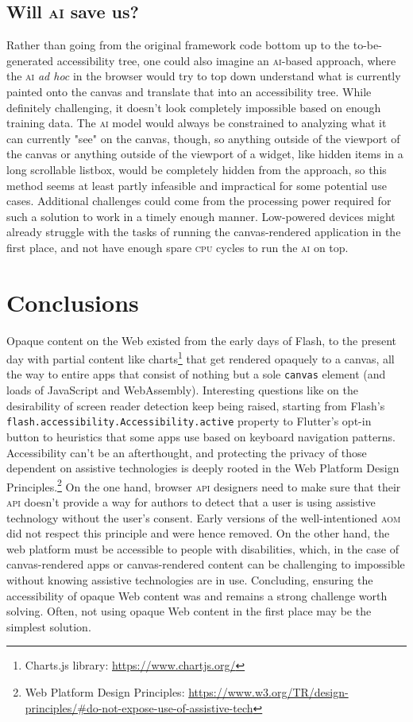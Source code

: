 \documentclass[sigconf]{acmart}
\begin{document}
\subsection{Will \textsc{ai} save us?}

Rather than going from the original framework code bottom up to the to-be-generated accessibility tree, one could also imagine an \textsc{ai}-based approach, where the \textsc{ai} \textit{ad hoc} in the browser would try to top down understand what is currently painted onto the canvas and translate that into an accessibility tree. While definitely challenging, it doesn't look completely impossible based on enough training data. The \textsc{ai} model would always be constrained to analyzing what it can currently "see" on the canvas, though, so anything outside of the viewport of the canvas or anything outside of the viewport of a widget, like hidden items in a long scrollable listbox, would be completely hidden from the approach, so this method seems at least partly infeasible and impractical for some potential use cases. Additional challenges could come from the processing power required for such a solution to work in a timely enough manner. Low-powered devices might already struggle with the tasks of running the canvas-rendered application in the first place, and not have enough spare \textsc{cpu} cycles to run the \textsc{ai} on top. 

\section{Conclusions}

Opaque content on the Web existed from the early days of Flash, to the present day with partial content like charts\footnote{Charts.js library: \url{https://www.chartjs.org/}} that get rendered opaquely to a canvas, all the way to entire apps that consist of nothing but a sole \texttt{canvas} element (and loads of JavaScript and WebAssembly). Interesting questions like on the desirability of screen reader detection keep being raised, starting from Flash's \texttt{flash.accessibility.Accessibility.active} property to Flutter's opt-in button to heuristics that some apps use based on keyboard navigation patterns. Accessibility can't be an afterthought, and protecting the privacy of those dependent on assistive technologies is deeply rooted in the Web Platform Design Principles.\footnote{Web Platform Design Principles: \url{https://www.w3.org/TR/design-principles/#do-not-expose-use-of-assistive-tech}} On the one hand, browser \textsc{api} designers need to make sure that their \textsc{api} doesn't provide a way for authors to detect that a user is using assistive technology without the user's consent. Early versions of the well-intentioned \textsc{aom} did not respect this principle and were hence removed. On the other hand, the web platform must be accessible to people with disabilities, which, in the case of canvas-rendered apps or canvas-rendered content can be challenging to impossible without knowing assistive technologies are in use. Concluding, ensuring the accessibility of opaque Web content was and remains a strong challenge worth solving. Often, not using opaque Web content in the first place may be the simplest solution.
\end{document}
